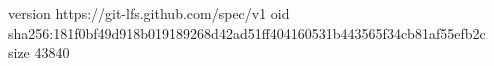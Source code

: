 version https://git-lfs.github.com/spec/v1
oid sha256:181f0bf49d918b019189268d42ad51ff404160531b443565f34cb81af55efb2c
size 43840
